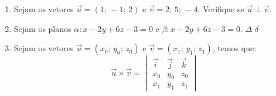 \documentclass[a4paper, 12pt]{article}
\begin{document}
\begin{enumerate}
 \item Sejam os vetores $\vec{u} = (1;\, -1;\, 2)$ e $\vec{v} = {2;\, 5;\, -4}$. Verifique se $\vec{u} \perp \vec{v}$. 
 
 \item Sejam os planos $\alpha : x -2y + 6z - 3 = 0$ e $\beta : x -2y + 6z - 3 = 0$. $\Delta$ $\delta$
 
 \item Sejam os vetores $\vec{u} = (x_0;\, y_0;\, z_0)$ e $\vec{v} = (x_1;\, y_1;\, z_1)$, temos que:
 $$
 \vec{u} \times \vec{v} =
 \begin{vmatrix}
  \vec{i} & \vec{j} & \vec{k} \\
  x_0 & y_0 & z_0 \\
  x_1 & y_1 & z_1 
 \end{vmatrix}
 $$
   
\end{enumerate}
 
\end{document}
